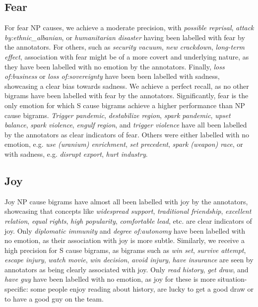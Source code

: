 \subsection{Fear}

For fear NP causes, we achieve a moderate precision, with \textit{possible reprisal}, \textit{attack by:ethnic\_albanian}, or \textit{humanitarian disaster} having been labelled with fear by the annotators. For others, such as \textit{security vacuum}, \textit{new crackdown}, \textit{long-term effect}, association with fear might be of a more covert and underlying nature, as they have been labelled with no emotion by the annotators. Finally, \textit{loss of:business} or \textit{loss of:sovereignty} have been been labelled with sadness, showcasing a clear bias towards sadness. We achieve a perfect recall, as no other bigrams have been labelled with fear by the annotators.
Significantly, fear is the only emotion for which S cause bigrams achieve a higher performance than NP cause bigrams. \textit{Trigger pandemic}, \textit{destabilize region}, \textit{spark pandemic}, \textit{upset balance}, \textit{spark violence}, \textit{engulf region}, and \textit{trigger violence} have all been labelled by the annotators as clear indicators of fear. Others were either labelled with no emotion, e.g. \textit{use (uranium) enrichment}, \textit{set precedent}, \textit{spark (weapon) race}, or with sadness, e.g. \textit{disrupt export}, \textit{hurt industry}.

\subsection{Joy}

Joy NP cause bigrams have almost all been labelled with joy by the annotators, showcasing that concepts like \textit{widespread support}, \textit{traditional friendship}, \textit{excellent relation}, \textit{equal rights}, \textit{high popularity}, \textit{comfortable lead}, etc. are clear indicators of joy. Only \textit{diplomatic immunity} and \textit{degree of:autonomy} have been labelled with no emotion, as their association with joy is more subtle.
Similarly, we receive a high precision for S cause bigrams, as bigrams such as \textit{win set}, \textit{survive attempt}, \textit{escape injury}, \textit{watch movie}, \textit{win decision}, \textit{avoid injury}, \textit{have insurance} are seen by annotators as being clearly associated with joy. Only \textit{read history}, \textit{get draw}, and \textit{have guy} have been labelled with no emotion, as joy for these is more situation-specific: some people enjoy reading about history, are lucky to get a good draw or to have a good guy on the team.

